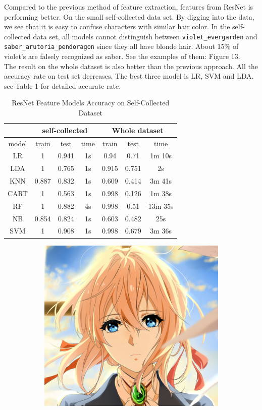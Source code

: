 \documentclass[11.5pt]{article}
\begin{document}
\begin{enumerate}
\begin{itemize}
            Compared to the previous method of feature extraction, features from ResNet is performing better. On the small self-collected data set. By digging into the data, we see that it is easy to confuse characters with similar hair color. In the self-collected data set, all models cannot distinguish between \texttt{violet\_evergarden} and \texttt{saber\_arutoria\_pendoragon} since they all have blonde hair. About 15\% of violet's are falsely recognized as saber. See the examples of them: Figure 13. \\
            The result on the whole dataset is also better than the previous approach. All the accuracy rate on test set decreases. The best three model is LR, SVM and LDA.
            see Table 1 for detailed accurate rate. 
            \begin{table}[h!]
                \centering
                \caption{ResNet Feature Models Accuracy on Self-Collected Dataset}
                    \begin{tabular}{|c|c|c|c|c|c|c|}
                        \hline
                         & \multicolumn{3}{|c|}{self-collected} & \multicolumn{3}{|c|}{Whole dataset} \\ \hline
                        model & train & test & time & train & test & time \\ \hline
                        LR & 1 & 0.941 & 1s & 0.94 & 0.71 & 1m 10s \\ \hline
                        LDA  & 1 & 0.765 & 1s & 0.915 & 0.751 & 2s \\ \hline
                        KNN & 0.887 & 0.832 & 1s & 0.609 & 0.414 & 3m 41s \\ \hline
                        CART & 1 & 0.563 & 1s & 0.998 & 0.126 & 1m 38s \\ \hline
                        RF & 1 & 0.882 & 4s & 0.998 & 0.51 & 13m 35s\\ \hline
                        NB & 0.854 & 0.824 & 1s & 0.603 & 0.482 & 25s \\ \hline
                        SVM  & 1 & 0.908 & 1s & 0.998 & 0.679 & 3m 36s \\ \hline
                    \end{tabular}
            \end{table}
            \begin{figure}[h!]
                \begin{subfigure}[b]{0.5\linewidth}
                    \centering
                    \includegraphics[width=0.5\linewidth]{images/violet.png}

\end{subfigure}
\end{figure}
\end{itemize}
\end{enumerate}
\end{document}
